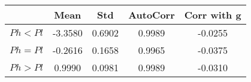 \begin{tiny}\begin{tabular}{|l|c|c|c|c|}
\hline
&\textbf{Mean}&\textbf{Std}&\textbf{AutoCorr}&\textbf{Corr with g}\\\hline
\textbf{$Ph<Pl$}&-3.3580&0.6902&0.9989&-0.0255\\\hline
\textbf{$Ph=Pl$}&-0.2616&0.1658&0.9965&-0.0375\\\hline
\textbf{$Ph>Pl$}&0.9990&0.0981&0.9989&-0.0310\\\hline
\end{tabular}
\end{tiny}